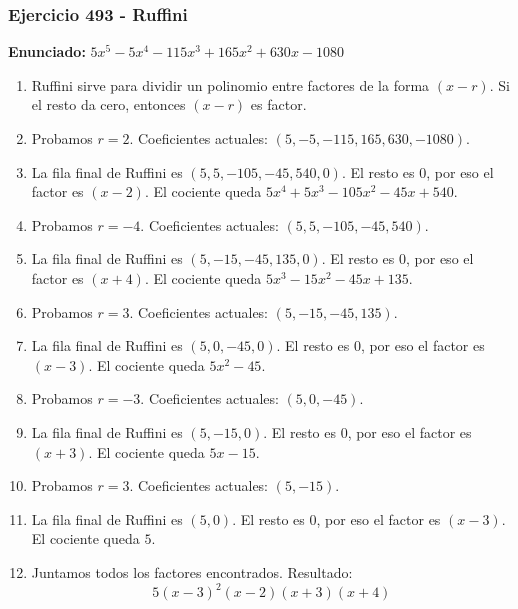 \documentclass[11pt,a4paper]{article}
\begin{document}
\subsubsection*{Ejercicio 493 - Ruffini}
\textbf{Enunciado:} $ 5 x^{5} - 5 x^{4} - 115 x^{3} + 165 x^{2} + 630 x - 1080 $\par
\begin{enumerate}[leftmargin=2em]
\item Ruffini sirve para dividir un polinomio entre factores de la forma \((x-r)\). Si el resto da cero, entonces \((x-r)\) es factor.
\item Probamos \(r=2\). Coeficientes actuales: \((5, -5, -115, 165, 630, -1080)\).
\item La fila final de Ruffini es \((5, 5, -105, -45, 540, 0)\). El resto es \(0\), por eso el factor es \((x-2)\). El cociente queda \(5 x^{4} + 5 x^{3} - 105 x^{2} - 45 x + 540\).
\item Probamos \(r=-4\). Coeficientes actuales: \((5, 5, -105, -45, 540)\).
\item La fila final de Ruffini es \((5, -15, -45, 135, 0)\). El resto es \(0\), por eso el factor es \((x+4)\). El cociente queda \(5 x^{3} - 15 x^{2} - 45 x + 135\).
\item Probamos \(r=3\). Coeficientes actuales: \((5, -15, -45, 135)\).
\item La fila final de Ruffini es \((5, 0, -45, 0)\). El resto es \(0\), por eso el factor es \((x-3)\). El cociente queda \(5 x^{2} - 45\).
\item Probamos \(r=-3\). Coeficientes actuales: \((5, 0, -45)\).
\item La fila final de Ruffini es \((5, -15, 0)\). El resto es \(0\), por eso el factor es \((x+3)\). El cociente queda \(5 x - 15\).
\item Probamos \(r=3\). Coeficientes actuales: \((5, -15)\).
\item La fila final de Ruffini es \((5, 0)\). El resto es \(0\), por eso el factor es \((x-3)\). El cociente queda \(5\).
\item Juntamos todos los factores encontrados. Resultado: \[\boxed{5 \left(x - 3\right)^{2} \left(x - 2\right) \left(x + 3\right) \left(x + 4\right)}\]
\end{enumerate}

\vspace{0.2cm}
\end{document}
